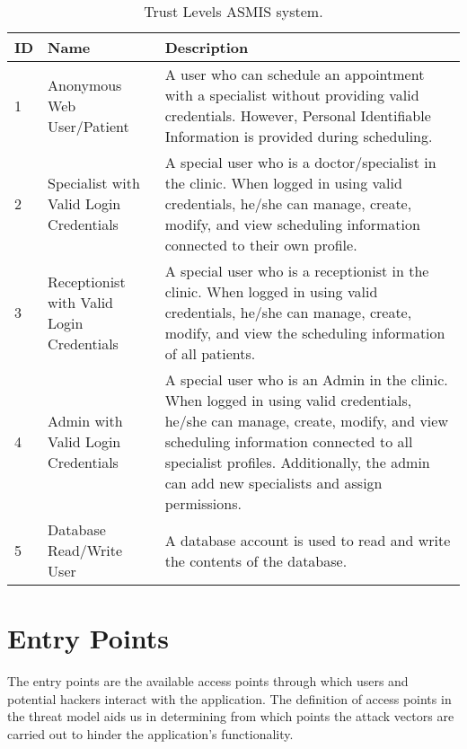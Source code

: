 \begingroup
\begin{table}[h!]
\centering
\setlength{\tabcolsep}{6.5pt} %
\renewcommand{\arraystretch}{1.8} %
\begin{tabular}{ |p{1cm}|p{6cm}|p{8cm}|}
 \hline
 \textbf{ID} & \textbf{Name} & \textbf{Description} \\ [0.5ex] 
 \hline
 1 & Anonymous Web User/Patient & A user who can schedule an appointment with a specialist without providing valid credentials. However, Personal Identifiable Information is provided during scheduling. \\
 \hline
 2 & Specialist with Valid Login Credentials & A special user who is a doctor/specialist in the clinic. When logged in using valid credentials, he/she can manage, create, modify, and view scheduling information connected to their own profile. \\
 \hline
 3 & Receptionist with Valid Login Credentials & A special user who is a receptionist in the clinic. When logged in using valid credentials, he/she can manage, create, modify, and view the scheduling information of all patients. \\
 \hline
 4 & Admin with Valid Login Credentials & A special user who is an Admin in the clinic. When logged in using valid credentials, he/she can manage, create, modify, and view scheduling information connected to all specialist profiles. Additionally, the admin can add new specialists and assign permissions.\\
 \hline
 5 & Database Read/Write User & A database account is used to read and write the contents of the database.  \\ [1ex]
 \hline
\end{tabular}
\caption{Trust Levels ASMIS system.}
\label{table:trust_levels}
\end{table}
\endgroup

\section{Entry Points}
The entry points are the available access points through which users and potential hackers interact with the application. The definition of access points in the threat model aids us in determining from which points the attack vectors are carried out to hinder the application's functionality.\newline

